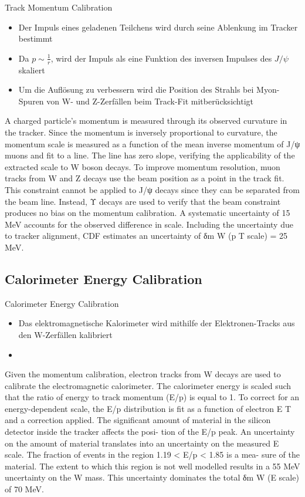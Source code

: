\documentclass[aspectratio=1610, 9pt]{beamer}
\begin{document}
\begin{frame}{Track Momentum Calibration}
  \begin{itemize}
    \item Der Impuls eines geladenen Teilchens wird durch seine Ablenkung im Tracker bestimmt
    \item Da $p \sim \frac{1}{r}$, wird der Impuls als eine Funktion des inversen Impulses des $J/\psi$ skaliert
    \item Um die Auflösung zu verbessern wird die Position des Strahls bei Myon-Spuren von W- und Z-Zerfällen beim Track-Fit mitberücksichtigt
  \end{itemize}
  A charged particle’s momentum is measured through its observed curvature in the tracker.
  Since the momentum is inversely proportional to curvature, the momentum scale is measured
  as a function of the mean inverse momentum of J/ψ muons and fit to a line. The line has zero
  slope, verifying the applicability of the extracted scale to W boson decays.
  To improve momentum resolution, muon tracks from W and Z decays use the beam position
  as a point in the track fit. This constraint cannot be applied to J/ψ decays since they can be
  separated from the beam line. Instead, Υ decays are used to verify that the beam constraint
  produces no bias on the momentum calibration. A systematic uncertainty of 15 MeV accounts
  for the observed difference in scale. Including the uncertainty due to tracker alignment, CDF
  estimates an uncertainty of δm W (p T scale) = 25 MeV.
\end{frame}

\subsection{Calorimeter Energy Calibration}

\begin{frame}{Calorimeter Energy Calibration}
  \begin{itemize}
    \item Das elektromagnetische Kalorimeter wird mithilfe der Elektronen-Tracks aus den W-Zerfällen kalibriert
    \item
  \end{itemize}


  Given the momentum calibration, electron tracks from W decays are used to calibrate the
  electromagnetic calorimeter. The calorimeter energy is scaled such that the ratio of energy
  to track momentum (E/p) is equal to 1. To correct for an energy-dependent scale, the E/p
  distribution is fit as a function of electron E T and a correction applied.
  The significant amount of material in the silicon detector inside the tracker affects the posi-
  tion of the E/p peak. An uncertainty on the amount of material translates into an uncertainty
  on the measured E scale. The fraction of events in the region 1.19 < E/p < 1.85 is a mea-
  sure of the material. The extent to which this region is not well modelled results in a 55 MeV
  uncertainty on the W mass. This uncertainty dominates the total δm W (E scale) of 70 MeV.
\end{frame}
\end{document}
